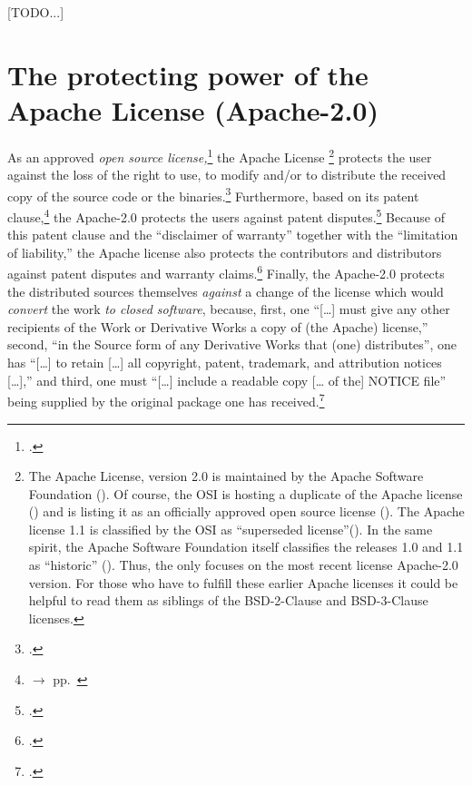 [TODO...]

\section{\texorpdfstring{The protecting power of the}{The} Apache License
(Apache-2.0)}

As an approved \emph{open source license,}\footcite[cf.][\nopage wp]{OSI2012b}
the Apache License%
  \footnote{The Apache License, version 2.0 is maintained by the
  Apache Software Foundation (\cite[cf.][\nopage wp]{AsfApacheLicense20a}).  Of
  course, the OSI is hosting a duplicate of the Apache license
  (\cite[cf.][\nopage wp]{Apl20OsiLicense2004a}) and is listing it as an
  officially approved open source license (\cite[cf.][\nopage wp]{OSI2012b}). The
  Apache license 1.1 is classified by the OSI as \enquote{superseded
  license}(\cite[cf.][\nopage wp]{OSI2013b}). In the same spirit, the Apache
  Software Foundation itself classifies the releases 1.0 and 1.1 as
  \enquote{historic} (\cite[cf.][\nopage wp]{AsfLicenses2013a}). Thus, the \oslic{}
  only focuses on the most recent license Apache-2.0 version. For those who have
  to fulfill these earlier Apache licenses it could be helpful to read them as siblings of
  the BSD-2-Clause and BSD-3-Clause licenses.}
protects the user against the loss of the
right to use, to modify and/or to distribute the received copy of the source
code or the binaries.\footcite[cf.][\nopage wp. §2]{Apl20OsiLicense2004a}
Furthermore, based on its patent clause,\footnote{$\rightarrow$ \oslic{} pp.\
} the Apache-2.0 protects the users against patent
disputes.\footcite[cf.][\nopage wp. §3]{Apl20OsiLicense2004a} Because of this
patent clause and the \enquote{disclaimer of warranty} together with the
\enquote{limitation of liability,} the Apache license also protects the
contributors and distributors against patent disputes and warranty
claims.\footcite[cf.][\nopage wp. §3, §7, §8]{Apl20OsiLicense2004a} Finally, the
Apache-2.0 protects the distributed sources themselves \emph{against} a change of the
license which would \emph{convert} the work \emph{to closed software}, because,
first, one \enquote{[\ldots] must give any other recipients of the Work or
Derivative Works a copy of (the Apache) license,} second, \enquote{in the Source
form of any Derivative Works that (one) distributes}, one has \enquote{[\ldots]
to retain [\ldots] all copyright, patent, trademark, and attribution notices
[\ldots],} and third, one must \enquote{[\ldots] include a readable copy [\ldots
of the] NOTICE file} being supplied by the original package one has
received.\footcite[cf.][\nopage wp. §4]{Apl20OsiLicense2004a}

